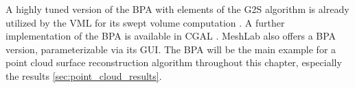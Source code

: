 \begin{description}
	A highly tuned version of the BPA with elements of the G2S algorithm is already utilized by the VML for its swept volume computation \cite{bpa_vml}.
	A further implementation of the BPA is available in CGAL \cite{cgal_bpa}.
	MeshLab also offers a BPA version, parameterizable via its GUI.
	The BPA will be the main example for a point cloud surface reconstruction algorithm throughout this chapter, especially the results \cref{sec:point_cloud_results}.

%


\end{description}
